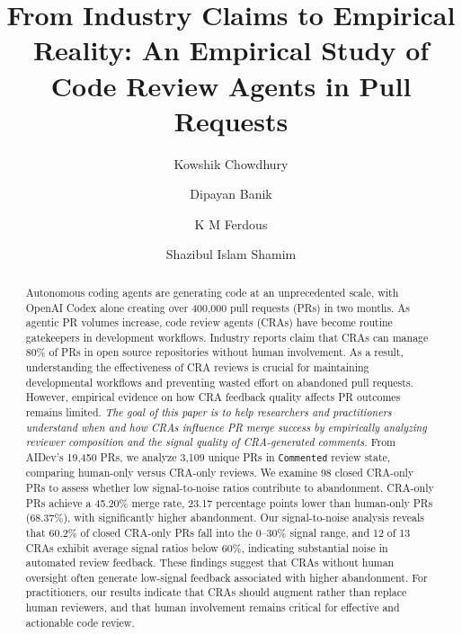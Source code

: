 \documentclass[sigconf]{acmart}
\begin{document}
\title{From Industry Claims to Empirical Reality: An Empirical Study of Code Review Agents in Pull Requests}



\author{Kowshik Chowdhury}

\author{Dipayan Banik}



\author{K M Ferdous}

\author{Shazibul Islam Shamim}



\begin{abstract}
Autonomous coding agents are generating code at an unprecedented scale, with OpenAI Codex alone creating over 400,000 pull requests (PRs) in two months. As agentic PR volumes increase, code review agents (CRAs) have become routine gatekeepers in development workflows. Industry reports claim that CRAs can manage 80\% of PRs in open source repositories without human involvement. As a result, understanding the effectiveness of CRA reviews is crucial for maintaining developmental workflows and preventing wasted effort on abandoned pull requests. However, empirical evidence on how CRA feedback quality affects PR outcomes remains limited. \textit{The goal of this paper is to help researchers and practitioners understand when and how CRAs influence PR merge success by empirically analyzing reviewer composition and the signal quality of CRA-generated comments. }From AIDev's 19,450 PRs, we analyze 3,109 unique PRs in \texttt{Commented} review state, comparing human-only versus CRA-only reviews. We examine 98 closed CRA-only PRs to assess whether low signal-to-noise ratios contribute to abandonment. CRA-only PRs achieve a 45.20\% merge rate, 23.17 percentage points lower than human-only PRs (68.37\%), with significantly higher abandonment. Our signal-to-noise analysis reveals that 60.2\% of closed CRA-only PRs fall into the 0--30\% signal range, and 12 of 13 CRAs exhibit average signal ratios below 60\%, indicating substantial noise in automated review feedback. These findings suggest that CRAs without human oversight often generate low-signal feedback associated with higher abandonment. For practitioners, our results indicate that CRAs should augment rather than replace human reviewers, and that human involvement remains critical for effective and actionable code review.
\end{abstract}
\end{document}
